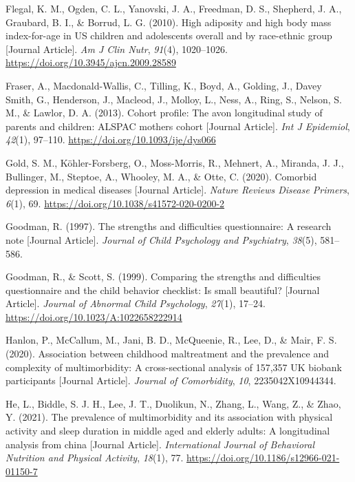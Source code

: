 \documentclass[
  letterpaper,
  DIV=11,
  numbers=noendperiod]{scrreport}
\newlength{\cslhangindent}
\newenvironment{CSLReferences}[2] %
 {\begin{list}{}{%
  \setlength{\itemindent}{0pt}
  \setlength{\leftmargin}{0pt}
  \setlength{\parsep}{0pt}
  \ifodd #1
   \setlength{\leftmargin}{\cslhangindent}
   \setlength{\itemindent}{-1\cslhangindent}
  \fi
  \setlength{\itemsep}{#2\baselineskip}}}
 {\end{list}}
\begin{document}
\begin{CSLReferences}{1}{0}
Flegal, K. M., Ogden, C. L., Yanovski, J. A., Freedman, D. S., Shepherd,
J. A., Graubard, B. I., \& Borrud, L. G. (2010). High adiposity and high
body mass index-for-age in US children and adolescents overall and by
race-ethnic group {[}Journal Article{]}. \emph{Am J Clin Nutr},
\emph{91}(4), 1020--1026. \url{https://doi.org/10.3945/ajcn.2009.28589}

Fraser, A., Macdonald-Wallis, C., Tilling, K., Boyd, A., Golding, J.,
Davey Smith, G., Henderson, J., Macleod, J., Molloy, L., Ness, A., Ring,
S., Nelson, S. M., \& Lawlor, D. A. (2013). Cohort profile: The avon
longitudinal study of parents and children: ALSPAC mothers cohort
{[}Journal Article{]}. \emph{Int J Epidemiol}, \emph{42}(1), 97--110.
\url{https://doi.org/10.1093/ije/dys066}

Gold, S. M., Köhler-Forsberg, O., Moss-Morris, R., Mehnert, A., Miranda,
J. J., Bullinger, M., Steptoe, A., Whooley, M. A., \& Otte, C. (2020).
Comorbid depression in medical diseases {[}Journal Article{]}.
\emph{Nature Reviews Disease Primers}, \emph{6}(1), 69.
\url{https://doi.org/10.1038/s41572-020-0200-2}

Goodman, R. (1997). The strengths and difficulties questionnaire: A
research note {[}Journal Article{]}. \emph{Journal of Child Psychology
and Psychiatry}, \emph{38}(5), 581--586.

Goodman, R., \& Scott, S. (1999). Comparing the strengths and
difficulties questionnaire and the child behavior checklist: Is small
beautiful? {[}Journal Article{]}. \emph{Journal of Abnormal Child
Psychology}, \emph{27}(1), 17--24.
\url{https://doi.org/10.1023/A:1022658222914}

Hanlon, P., McCallum, M., Jani, B. D., McQueenie, R., Lee, D., \& Mair,
F. S. (2020). Association between childhood maltreatment and the
prevalence and complexity of multimorbidity: A cross-sectional analysis
of 157,357 UK biobank participants {[}Journal Article{]}. \emph{Journal
of Comorbidity}, \emph{10}, 2235042X10944344.

He, L., Biddle, S. J. H., Lee, J. T., Duolikun, N., Zhang, L., Wang, Z.,
\& Zhao, Y. (2021). The prevalence of multimorbidity and its association
with physical activity and sleep duration in middle aged and elderly
adults: A longitudinal analysis from china {[}Journal Article{]}.
\emph{International Journal of Behavioral Nutrition and Physical
Activity}, \emph{18}(1), 77.
\url{https://doi.org/10.1186/s12966-021-01150-7}


\end{CSLReferences}
\end{document}
